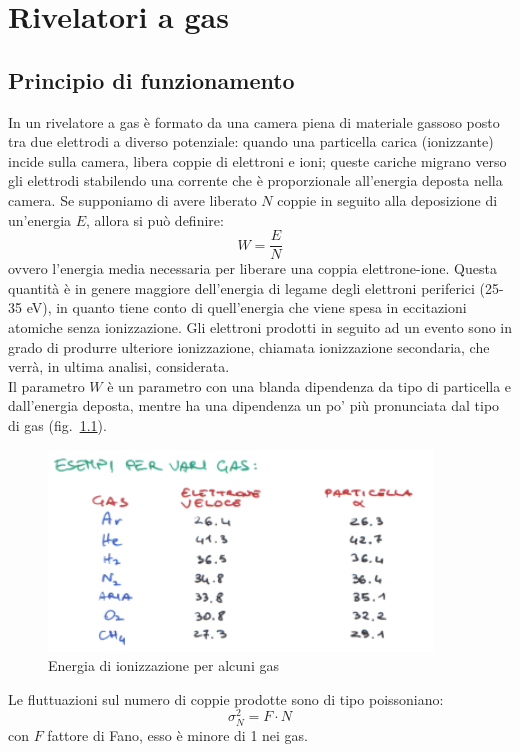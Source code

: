 \chapter{Rivelatori a gas}
\section{Principio di funzionamento}
In un rivelatore a gas \`e formato da una camera piena di materiale gassoso posto tra due elettrodi a diverso potenziale:
quando una particella carica (ionizzante) incide sulla camera, libera coppie di elettroni e ioni; 
queste cariche migrano verso gli elettrodi stabilendo una corrente che \`e proporzionale all'energia deposta nella camera.
Se supponiamo di avere liberato $N$ coppie in seguito alla deposizione di un'energia $E$, allora si pu\`o definire:
\begin{equation*}
W = \frac{E}{N}
\end{equation*}
ovvero l'energia media necessaria per liberare una coppia elettrone-ione.
Questa quantit\`a \`e in genere maggiore dell'energia di legame degli elettroni periferici (25-35 eV), in quanto tiene conto di quell'energia che
viene spesa in eccitazioni atomiche senza ionizzazione.
Gli elettroni prodotti in seguito ad un evento sono in grado di produrre ulteriore ionizzazione, chiamata ionizzazione secondaria, che verr\`a, in
ultima analisi, considerata.\\
Il parametro $W$ \`e un parametro con una blanda dipendenza da tipo di particella e dall'energia deposta,
mentre ha una dipendenza un po' pi\`u pronunciata dal tipo di gas (fig.~\ref{fig:energiaIonizzazioneGas}).
\begin{figure}[htbp]
\begin{center}
	\includegraphics[scale=1]{./Immagini/EnergiaIonizzazioneGas.png}
\caption{Energia di ionizzazione per alcuni gas}
\label{fig:energiaIonizzazioneGas}
\end{center}
\end{figure}
Le fluttuazioni sul numero di coppie prodotte sono di tipo poissoniano:
\begin{equation*}
\sigma_N^2 =F \cdot N
\end{equation*}
con $F$ fattore di Fano, esso \`e minore di 1 nei gas.
